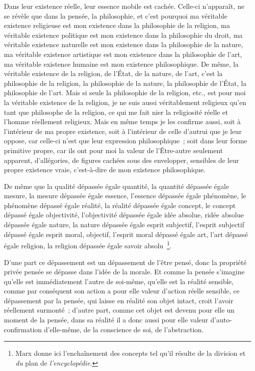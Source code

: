 \documentclass[french,twoside]{book} %
\begin{document}
Dans leur existence réelle, leur essence mobile est cachée. Celle-ci n’apparaît, ne se révèle que dans la pensée, la philosophie, et c’est pourquoi ma véritable existence religieuse est mon existence dans la philosophie de la religion, ma véritable existence politique est mon existence dans la philosophie du droit, ma véritable existence naturelle est mon existence dans la philosophie de la nature, ma véritable existence artistique est mon existence dans la philosophie de l’art, ma véritable existence humaine est mon existence philosophique. De même, la véritable existence de la religion, de l’État, de la nature, de l’art, c’est la philosophie de la religion, la philosophie de la nature, la philosophie de l’État, la philosophie de l’art. Mais si seule la philosophie de la religion, etc., est pour moi la véritable existence de la religion, je ne suis aussi véritablement religieux qu’en tant que philosophe de la religion, ce qui me fait nier la religiosité réelle et l’homme réellement religieux. Mais en même temps je les confirme aussi, soit à l’intérieur de ma propre existence, soit à l’intérieur de celle d’autrui que je leur oppose, car celle-ci n’est que leur expression philosophique ; soit dans leur forme primitive propre, car ils ont pour moi la valeur de l’Être-autre seulement apparent, d’allégories, de figures cachées sous des envelopper, sensibles de leur propre existence vraie, c’est-à-dire de mon existence philosophique.\par
De même que la qualité dépassée égale quantité, la quantité dépassée égale mesure, la mesure dépassée égale essence, l’essence dépassée égale phénomène, le phénomène dépassé égale réalité, la réalité dépassée égale concept, le concept dépassé égale objectivité, l’objectivité dépassée égale idée absolue, ridée absolue dépassée égale nature, la nature dépassée égale esprit subjectif, l’esprit subjectif dépassé égale esprit moral, objectif, l’esprit moral dépassé égale art, l’art dépassé égale religion, la religion dépassée égale savoir absolu \footnote{Marx donne ici l’enchaînement des concepts tel qu’il résulte de la division et \emph{du} plan de \emph{l’encyclopédie.}}.\par
D’une part ce dépassement est un dépassement de l’être pensé, donc la propriété privée pensée se dépasse dans l’idée de la morale. Et comme la pensée s’imagine qu’elle est immédiatement l’autre de soi-même, qu’elle est la réalité sensible, comme par conséquent son action a pour elle valeur d’action réelle sensible, ce dépassement par la pensée, qui laisse en réalité son objet intact, croit l’avoir réellement surmonté ; d’autre part, comme cet objet est devenu pour elle un moment de la pensée, dans sa réalité il a donc aussi pour elle valeur d’auto-confirmation d’elle-même, de la conscience de soi, de l’abstraction.\par
\end{document}
